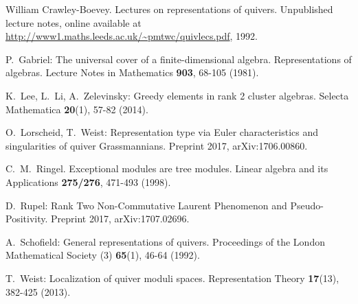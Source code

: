 \documentclass{amsart}
\numberwithin{equation}{section}
\begin{document}
\begin{thebibliography}{10}
William Crawley-Boevey. Lectures on representations of quivers. Unpublished lecture notes, online available at \url{http://www1.maths.leeds.ac.uk/~pmtwc/quivlecs.pdf}, 1992.
	

  P.~Gabriel: The universal cover of a finite-dimensional algebra. Representations of algebras. Lecture Notes in Mathematics {\bf 903}, 68-105 (1981).

  K.~Lee, L.~Li, A.~Zelevinsky: Greedy elements in rank 2 cluster algebras. Selecta Mathematica \textbf{20}(1), 57-82 (2014).

  O.~Lorscheid, T.~Weist: Representation type via Euler characteristics and singularities of quiver Grassmannians. Preprint 2017, arXiv:1706.00860.

  C.~M.~Ringel. Exceptional modules are tree modules. Linear algebra and its Applications \textbf{275/276}, 471-493 (1998).

  D.~Rupel: Rank Two Non-Commutative Laurent Phenomenon and Pseudo-Positivity. Preprint 2017, arXiv:1707.02696.

  A.~Schofield: General representations of quivers. Proceedings of the London Mathematical Society (3) \textbf{65}(1), 46-64 (1992).

  T.~Weist: Localization of quiver moduli spaces. Representation Theory \textbf{17}(13), 382-425 (2013).

\end{thebibliography}
\end{document}
